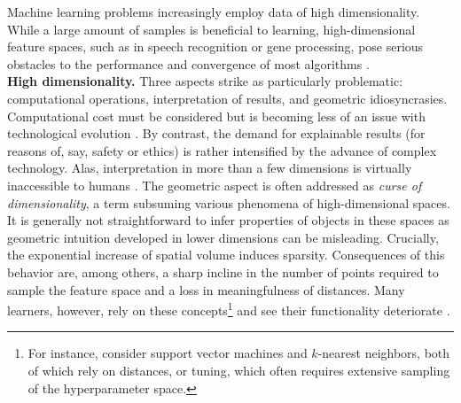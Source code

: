 Machine learning problems increasingly employ data of high dimensionality. 
While a large amount of samples is beneficial to learning, high-dimensional 
feature spaces, such as in speech recognition or gene processing, pose serious 
obstacles to the performance and convergence of most algorithms 
\citep{cayton2005}. 
\\

\textbf{High dimensionality.}
Three aspects strike as particularly problematic: computational operations, 
interpretation of results, and geometric idiosyncrasies.
Computational cost must be considered but is becoming less of an issue with 
technological evolution \citep{leistetal2009}.
By contrast, the demand for explainable results (for reasons of, say, safety or
ethics) is rather intensified by the advance of complex technology. 
Alas, interpretation in more than a few dimensions is virtually inaccessible to 
humans \citep{doshivelezkim2017}. 
The geometric aspect is often addressed as \textit{curse of dimensionality}, a 
term subsuming various phenomena of high-dimensional spaces. 
It is generally not straightforward to infer properties of objects in these 
spaces as geometric intuition developed in lower dimensions can be 
misleading.
Crucially, the exponential increase of spatial volume induces sparsity. 
Consequences of this behavior are, among others, a sharp incline in the number 
of points required to sample the feature space and a loss in meaningfulness of 
distances. 
Many learners, however, rely on these 
concepts\footnote{For instance, consider support vector machines and
$k$-nearest neighbors, both of which rely on distances, or tuning, which often
requires extensive sampling of the hyperparameter space.} and see 
their functionality deteriorate \citep{verleysenfrancois2005}. 
\\

